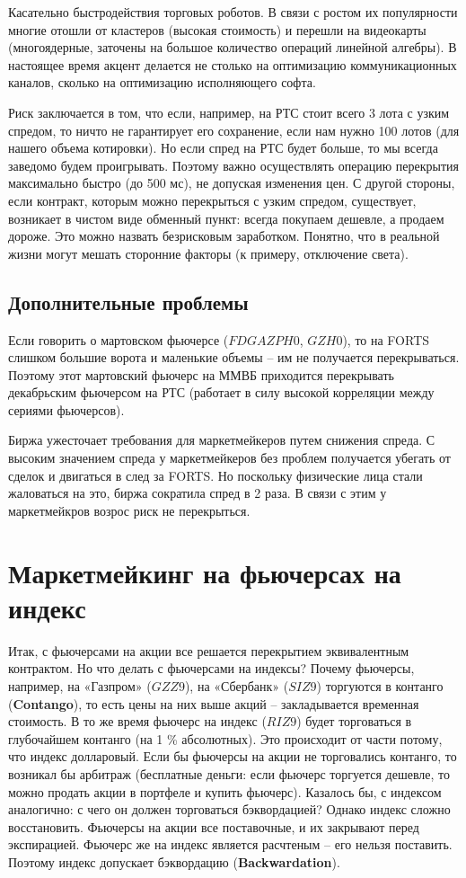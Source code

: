 \documentclass{article}
\begin{document}
Касательно быстродействия торговых роботов. В связи с ростом их популярности многие отошли от кластеров (высокая стоимость) и перешли на видеокарты (многоядерные, заточены на большое количество операций линейной алгебры). В настоящее время акцент делается не столько на оптимизацию коммуникационных каналов, сколько на оптимизацию исполняющего софта. 

Риск заключается в том, что если, например, на РТС стоит всего 3 лота с узким спредом, то ничто не гарантирует его сохранение, если нам нужно 100 лотов (для нашего объема котировки). Но если спред на РТС будет больше, то мы всегда заведомо будем проигрывать. Поэтому важно осуществлять операцию перекрытия максимально быстро (до 500 мс), не допуская изменения цен. С другой стороны, если контракт, которым можно перекрыться с узким спредом, существует, возникает в чистом виде обменный пункт: всегда покупаем дешевле, а продаем дороже. Это можно назвать безрисковым заработком. Понятно, что в реальной жизни могут мешать сторонние факторы (к примеру, отключение света).

\subsection{Дополнительные проблемы}

Если говорить о мартовском фьючерсе ($ FDGAZPH0 $, $ GZH0 $), то на FORTS слишком большие ворота и маленькие объемы – им не получается перекрываться. Поэтому этот мартовский фьючерс на ММВБ приходится перекрывать декабрьским фьючерсом на РТС (работает в силу высокой корреляции между сериями фьючерсов). 

Биржа ужесточает требования для маркетмейкеров путем снижения спреда. С высоким значением спреда у маркетмейкеров без проблем получается убегать от сделок и двигаться в след за FORTS. Но поскольку физические лица стали жаловаться на это, биржа сократила спред в 2 раза. В связи с этим у маркетмейкров возрос риск не перекрыться. 

\section{Маркетмейкинг на фьючерсах на индекс}

Итак, с фьючерсами на акции все решается перекрытием эквивалентным контрактом. Но что делать с фьючерсами на индексы? Почему фьючерсы, например, на «Газпром» ($ GZZ9 $), на «Сбербанк» ($ SIZ9 $) торгуются в контанго (\textbf{Contango}), то есть цены на них выше акций – закладывается временная стоимость. В то же время фьючерс на индекс ($ RIZ9 $) будет торговаться в глубочайшем контанго (на 1 \% абсолютных). Это происходит от части потому, что индекс долларовый. Если бы фьючерсы на акции не торговались контанго, то возникал бы арбитраж (бесплатные деньги: если фьючерс торгуется дешевле, то можно продать акции в портфеле и купить фьючерс). Казалось бы, с индексом аналогично: с чего он должен торговаться бэквордацией? Однако индекс сложно восстановить. Фьючерсы на акции все поставочные, и их закрывают перед экспирацией. Фьючерс же на индекс является расчтеным – его нельзя поставить. Поэтому индекс допускает бэквордацию (\textbf{Backwardation}). 
\end{document}

